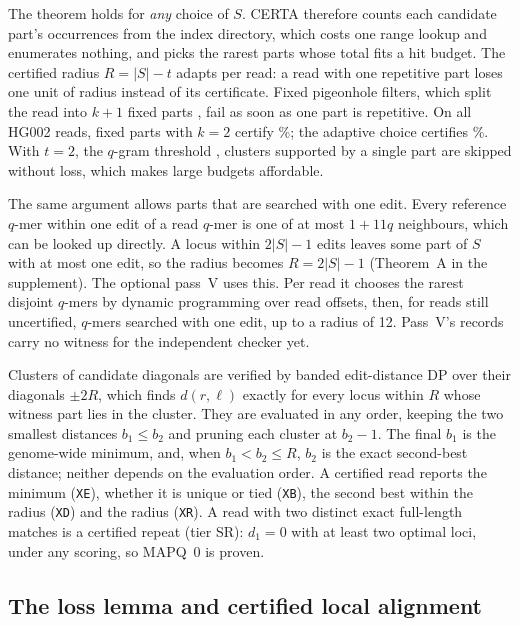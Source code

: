 \documentclass[11pt]{article}
\theoremstyle{definition}
\newcommand{\samtag}[1]{\texttt{#1}}
\begin{document}
The theorem holds for \emph{any} choice of $S$. CERTA therefore counts each
candidate part's occurrences from the index directory, which costs one
range lookup and enumerates nothing, and picks the rarest parts whose
total fits a hit budget. The certified radius $R=|S|-t$ adapts per read: a
read with one repetitive part loses one unit of radius instead of its
certificate. Fixed pigeonhole filters, which split the read into
$k+1$ fixed parts \citep{navarro2001guided}, fail as soon as one part is
repetitive. On all HG002 reads, fixed parts with $k=2$ certify \SeCertFixed\%;
the adaptive choice certifies \SeCert\%. With $t=2$, the $q$-gram threshold
\citep{ukkonen1992qgram}, clusters supported by a single part are skipped
without loss, which makes large budgets affordable.

The same argument allows parts that are searched with one edit. Every
reference $q$-mer within one edit of a read $q$-mer is one of at most
$1+11q$ neighbours, which can be looked up directly. A locus within
$2|S|-1$ edits leaves some part of $S$ with at most one edit, so the radius
becomes $R=2|S|-1$ (Theorem~A in the supplement). The optional pass~V uses
this. Per read it chooses the rarest disjoint $q$-mers by dynamic
programming over read offsets, then, for reads still uncertified, $q$-mers
searched with one edit, up to a radius of 12. Pass~V's records carry no
witness for the independent checker yet.

Clusters of candidate diagonals are verified by banded edit-distance DP
over their diagonals $\pm 2R$, which finds $d(r,\ell)$ exactly for every
locus within $R$ whose witness part lies in the cluster. They are evaluated
in any order, keeping the two smallest distances $b_1\le b_2$ and pruning
each cluster at $b_2-1$. The final $b_1$ is the genome-wide minimum, and,
when $b_1<b_2\le R$, $b_2$ is the exact second-best distance; neither
depends on the evaluation order. A certified read reports the minimum
(\samtag{XE}), whether it is unique or tied (\samtag{XB}), the second best within
the radius (\samtag{XD}) and the radius (\samtag{XR}). A read with two distinct
exact full-length matches is a certified repeat (tier SR): $d_1=0$ with at
least two optimal loci, under any scoring, so MAPQ~0 is proven.

\subsection{The loss lemma and certified local alignment}\label{sec:loss}
\end{document}
